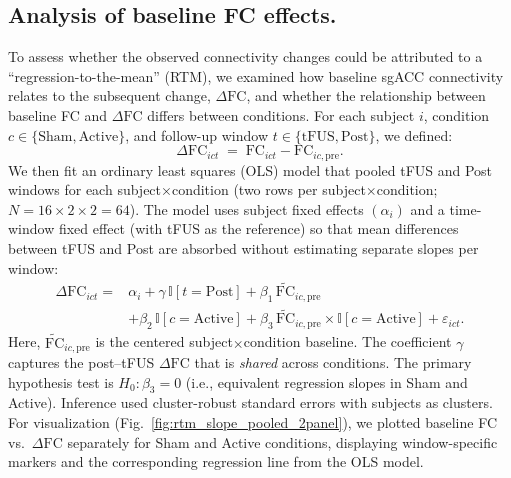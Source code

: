 \subsection*{Analysis of baseline FC effects.}
\noindent
To assess whether the observed connectivity changes could be attributed to a ``regression-to-the-mean'' (RTM), we examined how baseline sgACC connectivity relates to the subsequent change, \(\Delta \mathrm{FC}\), and whether the relationship between baseline FC and $\Delta \mathrm{FC}$ differs between conditions. For each subject \(i\), condition \(c\in\{\text{Sham},\text{Active}\}\), and follow-up window \(t\in\{\text{tFUS},\text{Post}\}\), we defined:
\begin{equation}
\label{eq:delta_fc_def}
\Delta \mathrm{FC}_{ict} \;=\; \mathrm{FC}_{ict} - \mathrm{FC}_{ic,\mathrm{pre}}.
\end{equation}
We then fit an ordinary least squares (OLS) model that pooled tFUS and Post windows for each subject\(\times\)condition (two rows per subject\(\times\)condition; \(N=16\times 2\times 2=64\)). The model uses subject fixed effects \((\alpha_i)\) and a time-window fixed effect (with tFUS as the reference) so that mean differences between tFUS and Post are absorbed without estimating separate slopes per window:
\begin{equation}
    \begin{aligned}
    \Delta \mathrm{FC}_{ict} = {}& \alpha_i
      + \gamma\,\mathbb{I}[t=\text{Post}]
      + \beta_1\,\widetilde{\mathrm{FC}}_{ic,\mathrm{pre}} \\
    & + \beta_2\,\mathbb{I}[c=\text{Active}]
      + \beta_3\,\widetilde{\mathrm{FC}}_{ic,\mathrm{pre}}\times \mathbb{I}[c=\text{Active}]
      + \varepsilon_{ict}.
    \end{aligned}
    \end{equation}
Here, \(\widetilde{\mathrm{FC}}_{ic,\mathrm{pre}}\) is the centered subject\(\times\)condition baseline. The coefficient \(\gamma\) captures the post--tFUS \(\Delta \mathrm{FC}\) that is \emph{shared} across conditions. The primary hypothesis test is \(H_0:\beta_3=0\) (i.e., equivalent regression slopes in Sham and Active). Inference used cluster-robust standard errors with subjects as clusters. For visualization (Fig.~\ref{fig:rtm_slope_pooled_2panel}), we plotted baseline FC vs.\ \(\Delta \mathrm{FC}\) separately for Sham and Active conditions, displaying window-specific markers and the corresponding regression line from the OLS model.


